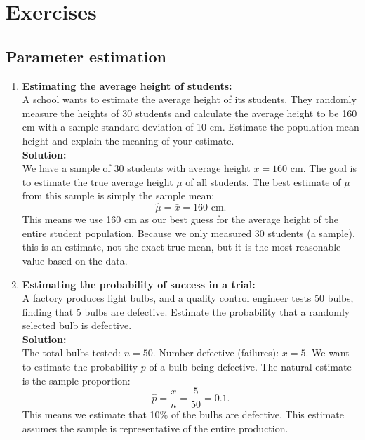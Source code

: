 \documentclass{book}
\begin{document}
\section*{Exercises}

\subsection*{Parameter estimation}

\begin{enumerate}

    \item \textbf{Estimating the average height of students:} \\
    A school wants to estimate the average height of its students. They randomly measure the heights of 30 students and calculate the average height to be 160 cm with a sample standard deviation of 10 cm. Estimate the population mean height and explain the meaning of your estimate. \\
    
    \textbf{Solution:} \\
    We have a sample of 30 students with average height \(\bar{x} = 160\) cm. The goal is to estimate the true average height \(\mu\) of all students. The best estimate of \(\mu\) from this sample is simply the sample mean:
    \[
    \hat{\mu} = \bar{x} = 160 \text{ cm}.
    \]
    This means we use 160 cm as our best guess for the average height of the entire student population. Because we only measured 30 students (a sample), this is an estimate, not the exact true mean, but it is the most reasonable value based on the data.

    \item \textbf{Estimating the probability of success in a trial:} \\
    A factory produces light bulbs, and a quality control engineer tests 50 bulbs, finding that 5 bulbs are defective. Estimate the probability that a randomly selected bulb is defective. \\
    
    \textbf{Solution:} \\
    The total bulbs tested: \(n = 50\). Number defective (failures): \(x = 5\). We want to estimate the probability \(p\) of a bulb being defective. The natural estimate is the sample proportion:
    \[
    \hat{p} = \frac{x}{n} = \frac{5}{50} = 0.1.
    \]
    This means we estimate that 10\% of the bulbs are defective. This estimate assumes the sample is representative of the entire production.


\end{enumerate}
\end{document}
